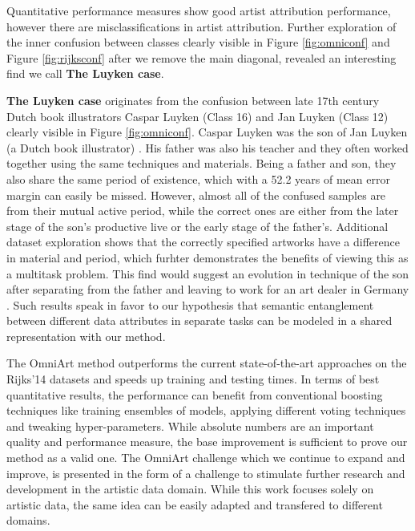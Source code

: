 \documentclass[sigconf]{acmart}
\begin{document}
 Quantitative performance measures show good artist attribution performance, however there are misclassifications in artist attribution. Further exploration of the inner confusion between classes clearly visible in Figure \ref{fig:omniconf} and Figure \ref{fig:rijksconf} after we remove the main diagonal, revealed an interesting find we call \textbf{The Luyken case}. 

\textbf{The Luyken case} originates from the confusion between late 17th century Dutch book illustrators Caspar Luyken (Class 16) and Jan Luyken (Class 12) clearly visible in Figure \ref{fig:omniconf}. Caspar Luyken was the son of Jan Luyken (a Dutch book illustrator) \cite{franits2004dutch}. His father was also his teacher and they often worked together using the same techniques and materials. Being a father and son, they also share the same period of existence, which with a 52.2 years of mean error margin can easily be missed. However, almost all of the confused samples are from their mutual active period, while the correct ones are either from the later stage of the son's productive live or the early stage of the father's. Additional dataset exploration shows that the correctly specified artworks have a difference in material and period, which furhter demonstrates the benefits of viewing this as a multitask problem. This find would suggest an evolution in technique of the son after separating from the father and leaving to work for an art dealer in Germany \cite{doi:10.7227/ALX.21.2.2}. Such results speak in favor to our hypothesis that semantic entanglement between different data attributes in separate tasks can be modeled in a shared representation with our method. 


The OmniArt method outperforms the current state-of-the-art approaches on the Rijks'14 datasets and speeds up training and testing times. In terms of best quantitative results, the performance can benefit from conventional boosting techniques like training ensembles of models, applying different voting techniques and tweaking hyper-parameters. While absolute numbers are an important quality and performance measure, the base improvement is sufficient to prove our method as a valid one. The OmniArt challenge which we continue to expand and improve, is presented in the form of a challenge to stimulate further research and development in the artistic data domain. While this work focuses solely on artistic data, the same idea can be easily adapted and transfered to different domains. 


 
\end{document}
